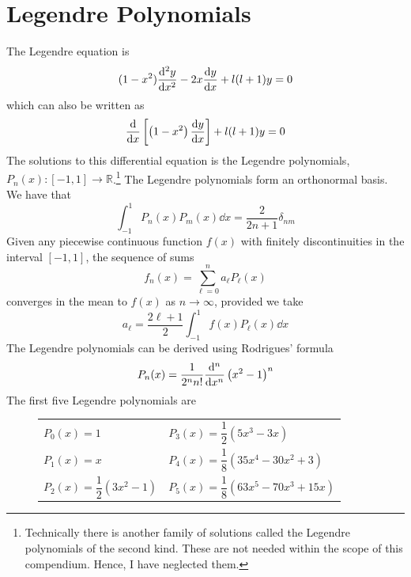 \documentclass[oneside]{book}
\numberwithin{figure}{section}
\numberwithin{equation}{section}
\newcommand{\paren}[1]{\left(#1\right)}
\theoremstyle{definition}
\begin{document}
	\section{Legendre Polynomials}
	The Legendre equation is
	\begin{equation}
		(1 - x^2)\dv[2]{y}{x} - 2x\dv{y}{x} + l(l + 1)y = 0
	\end{equation}
	which can also be written as
	\begin{equation}
		\dv{x}\left[\paren{1 - x^2}\dv{y}{x}\right] + l(l + 1)y = 0
	\end{equation}
	The solutions to this differential equation is the Legendre polynomials, $ P_n(x) : [-1,1] \to \mathbb{R} $.\footnote{Technically there is another family of solutions called the Legendre polynomials of the second kind. These are not needed within the scope of this compendium. Hence, I have neglected them.} The Legendre polynomials form an orthonormal basis. We have that
	\begin{equation}
		\int_{-1}^{1}P_n(x)P_m(x)\dd{x} = \dfrac{2}{2n + 1}\delta_{nm}
	\end{equation}
	Given any piecewise continuous function $ f(x) $ with finitely discontinuities in the interval $ [-1,1] $, the sequence of sums
	\begin{equation}
		f_n(x) = \sum_{\ell = 0}^{n}a_\ell P_\ell(x)
	\end{equation}
	converges in the mean to $ f(x) $ as $ n \to \infty $, provided we take
	\begin{equation}
		a_\ell = \dfrac{2\ell + 1}{2}\int_{-1}^{1}f(x)P_\ell(x)\dd{x}
	\end{equation}
	The Legendre polynomials can be derived using Rodrigues' formula
	\begin{equation}
		P_n(x) = \dfrac{1}{2^nn!}\dv[n]{x}\paren{x^2 - 1}^n
	\end{equation}
	The first five Legendre polynomials are
	\begin{figure}[H]
		\centering
		\bgroup
		\setlength\extrarowheight{10pt}
		\begin{tabularx}{\columnwidth}{|X X|}
			\hline
			$ P_0(x) = 1 $ & $ P_3(x) = \dfrac{1}{2}\paren{5x^3 - 3x} $\\[1em]
			$ P_1(x) = x $ & $ P_4(x) = \dfrac{1}{8}\paren{35x^4 - 30x^2 + 3} $\\[1em]
			$ P_2(x) = \dfrac{1}{2}\paren{3x^2 - 1} $ & $ P_5(x) = \dfrac{1}{8}\paren{63x^5 - 70x^3 + 15x} $\\[1em]
			\hline
		\end{tabularx}
		\egroup
	\end{figure}
\end{document}
